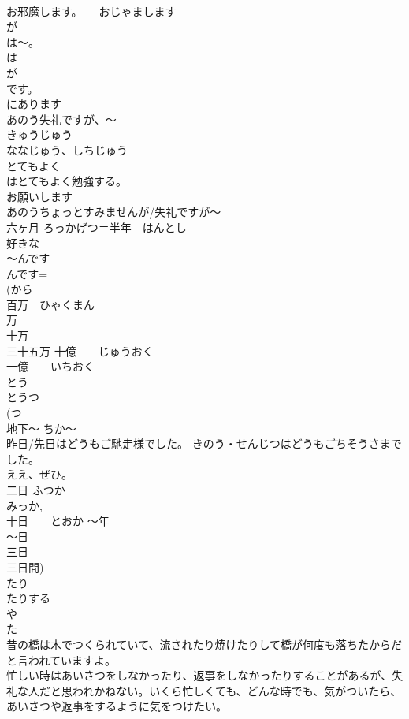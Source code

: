 \documentclass[8pt]{extreport}
\begin{document}
\begin{CJK}{UTF8}{min}
\\	お邪魔します。　　おじゃまします 
\\	が
\\	は～。	
\\	は 
\\	が 
\\	です。	
\\	にあります 
\\	あのう失礼ですが、～	
\\	きゅうじゅう 
\\	ななじゅう、しちじゅう
\\	とてもよく
\\	はとてもよく勉強する。 
\\	お願いします	
\\	あのうちょっとすみませんが/失礼ですが～ 
\\	六ヶ月	ろっかげつ＝半年　はんとし
\\	好きな
\\	～んです	
\\	んです= 
\\	(から 
\\	百万　ひゃくまん 
\\	万 
\\	十万 
\\	三十五万 十億　　じゅうおく 
\\	一億　　いちおく 
\\	とう	
\\	とうつ 
\\	(つ
\\	地下～	ちか～ 
\\	昨日/先日はどうもご馳走様でした。	きのう・せんじつはどうもごちそうさまでした。 
\\	ええ、ぜひ。	
\\	二日	ふつか 
\\	みっか, 
\\	十日　　とおか ～年 
\\	～日 
\\	三日 
\\	三日間)
\\	たり
\\	たりする	
\\	や
\\	た 
\\	昔の橋は木でつくられていて、流されたり焼けたりして橋が何度も落ちたからだと言われていますよ。 
\\	忙しい時はあいさつをしなかったり、返事をしなかったりすることがあるが、失礼な人だと思われかねない。いくら忙しくても、どんな時でも、気がついたら、あいさつや返事をするように気をつけたい。 

\end{CJK}
\end{document}
